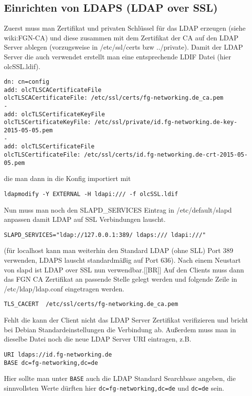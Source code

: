 \documentclass[11pt,a4paper,titlepage=firstiscover]{scrartcl} %
\begin{document}
\subsection{Einrichten von LDAPS (LDAP over SSL)}
Zuerst muss man Zertifikat und privaten Schlüssel für das LDAP erzeugen (siehe wiki:FGN-CA) und diese zusammen mit dem Zertifikat der CA auf den LDAP Server ablegen (vorzugsweise in /etc/ssl/certs bzw ../private). Damit der LDAP Server die auch verwendet erstellt man eine entsprechende LDIF Datei (hier olcSSL.ldif).
\begin{lstlisting}
dn: cn=config
add: olcTLSCACertificateFile
olcTLSCACertificateFile: /etc/ssl/certs/fg-networking.de_ca.pem
-
add: olcTLSCertificateKeyFile
olcTLSCertificateKeyFile: /etc/ssl/private/id.fg-networking.de-key-2015-05-05.pem
-
add: olcTLSCertificateFile
olcTLSCertificateFile: /etc/ssl/certs/id.fg-networking.de-crt-2015-05-05.pem
\end{lstlisting}
die man dann in die Konfig importiert mit
\begin{lstlisting}
ldapmodify -Y EXTERNAL -H ldapi:/// -f olcSSL.ldif
\end{lstlisting}
Nun muss man noch den SLAPD_SERVICES Eintrag in /etc/default/slapd anpassen damit LDAP auf SSL Verbindungen lauscht.
\begin{lstlisting}
SLAPD_SERVICES="ldap://127.0.0.1:389/ ldaps:/// ldapi:///"
\end{lstlisting}
(für localhost kann man weiterhin den Standard LDAP (ohne SLL) Port 389 verwenden, LDAPS lauscht standardmäßig auf Port 636). Nach einem Neustart von slapd ist LDAP over SSL nun verwendbar.[[BR]]
Auf den Clients muss dann das FGN CA Zertifikat an passende Stelle gelegt werden und folgende Zeile in /etc/ldap/ldap.conf eingetragen werden.
\begin{lstlisting}
TLS_CACERT  /etc/ssl/certs/fg-networking.de_ca.pem
\end{lstlisting}
Fehlt die kann der Client nicht das LDAP Server Zertifikat verifizieren und bricht bei Debian Standardeinstellungen die Verbindung ab. Außerdem muss man in dieselbe Datei noch die neue LDAP Server URI eintragen, z.B.
\begin{lstlisting}
URI ldaps://id.fg-networking.de
BASE dc=fg-networking,dc=de
\end{lstlisting}
Hier sollte man unter \texttt{BASE} auch die LDAP Standard Searchbase angeben, die sinnvollsten Werte dürften hier \texttt{dc=fg-networking,dc=de} und \texttt{dc=de} sein.
\end{document}
